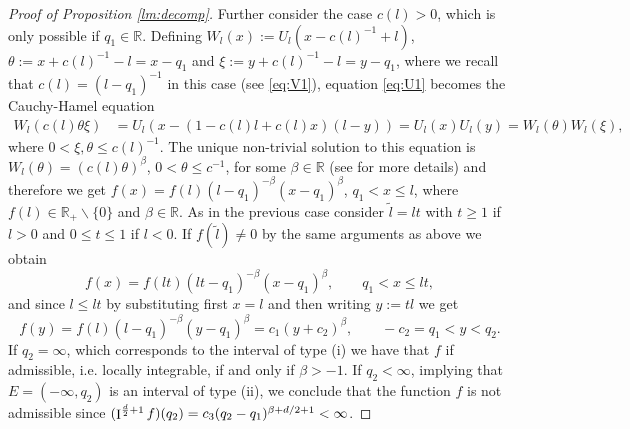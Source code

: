 \documentclass[11pt,a4paper]{article}
\theoremstyle{plain}
\theoremstyle{definition}
\theoremstyle{remark}
\def\RR{\mathbb{R}}
\newcommand{\frI}{\mathop{\mathrm{I}}\nolimits}
\newcommand{\bsl}{\backslash}
\begin{document}
\begin{proof}[Proof of Proposition \ref{lm:decomp}]
    Further consider the case $c(l) > 0$, which is only possible if $q_1\in\RR$. Defining $W_l(x):=U_l(x-c(l)^{-1}+l)$, $\theta :=x+c(l)^{-1}-l=x-q_1$ and $\xi :=y+c(l)^{-1}-l=y-q_1$, where we recall that $c(l)=(l-q_1)^{-1}$ in this case {(see \eqref{eq:V1})}, equation \eqref{eq:U1} becomes the Cauchy-Hamel equation
    \begin{align*}
        W_l(c(l)\theta\xi)&=U_l(x-(1-c(l)l+c(l)x)(l-y))= U_l(x)U_l(y)=W_l(\theta)W_l(\xi), 
    \end{align*}
    where $0<\xi, \theta \leq c(l)^{-1}.$ The unique non-trivial solution to this equation is $W_l(\theta)=(c(l)\theta)^\beta$, $0<\theta \leq c^{-1}$, for some $\beta \in \RR$ (see \cite[Section 1.1]{bingham_regular_variation} for more details) and therefore we get $f(x)=f(l)(l-q_1)^{-\beta}(x-q_1)^\beta$, $q_1<x\leq l$, where $f(l) \in \RR_+\bsl\{0\}$ and $\beta \in \RR$. As in the previous case consider $\widetilde l=lt$ with $t\ge 1$ if $l>0$ and $0\leq t\leq 1$ if $l<0$. If $f(\widetilde l)\neq 0$ by the same arguments as above we obtain
    \[
        f(x)=f(lt)(lt-q_1)^{-\beta}(x-q_1)^\beta, \qquad q_1<x\leq lt,
    \]
    and since $l\leq lt$ by substituting first $x=l$ and then writing $y:=tl$ we get
    \[
        f(y)=f(l)(l-q_1)^{-\beta}(y-q_1)^\beta=c_1(y+c_2)^\beta,\qquad -c_2=q_1<y<q_2.
    \]
    If $q_2=\infty$, which corresponds to the interval of type (i) we have that $f$ if admissible, i.e. locally integrable, if and only if $\beta>-1$. If $q_2<\infty$, implying that $E=(-\infty,q_2)$ is an interval of type (ii), we conclude that the function $f$ is not admissible since $(\frI^{{d\over 2}+1}f)(q_2)=c_3(q_2-q_1)^{\beta+d/2+1}<\infty$.
    

\end{proof}
\end{document}
